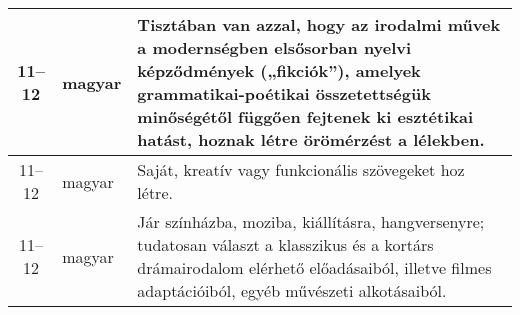 \begin{small}
\begin{longtable}{c | p{2cm} |  p{11cm} }
              11--12 & magyar & Tisztában van azzal, hogy az irodalmi művek a modernségben elsősorban nyelvi képződmények („fikciók”), amelyek grammatikai-poétikai összetettségük minőségétől függően fejtenek ki esztétikai hatást, hoznak létre örömérzést a lélekben. \\ \hline
              11--12 & magyar & Saját, kreatív vagy funkcionális szövegeket hoz létre. \\ \hline
              11--12 & magyar & Jár színházba, moziba, kiállításra, hangversenyre; tudatosan választ a klasszikus és a kortárs drámairodalom elérhető előadásaiból, illetve filmes adaptációiból, egyéb művészeti alkotásaiból. \\ \hline
      \end{longtable}
\end{small}





